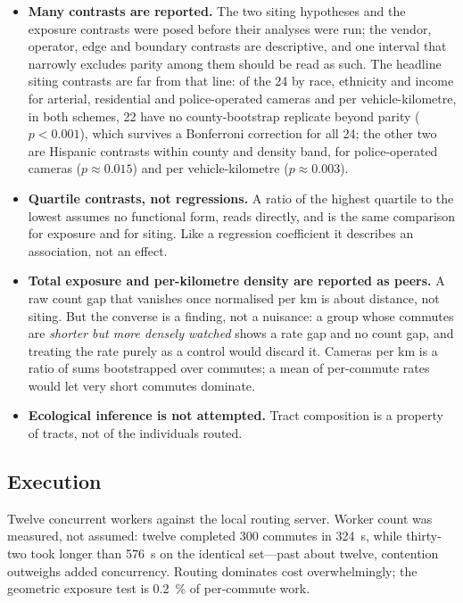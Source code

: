 \documentclass[11pt,twoside]{article}
\begin{document}
\begin{itemize}
{    parity} under both bootstraps. Earlier rounds of this study asked instead that the
    intervals on the two quartile means not overlap, a criterion far stricter than a
    \SI{5}{\percent} test \citep{schenker2001}; on the current map the two give the same
    verdict on every contrast of
    .
  \item \textbf{Many contrasts are reported.} The two siting hypotheses and the exposure
    contrasts were posed before their analyses were run; the vendor, operator, edge and
    boundary contrasts are descriptive, and one interval that narrowly excludes parity among
    them should be read as such. The headline siting contrasts are far from that line: of the
    24 by race, ethnicity and income for arterial, residential and police-operated cameras and
    per vehicle-kilometre, in both schemes, 22 have no county-bootstrap replicate beyond parity
    ($p<0.001$), which survives a Bonferroni correction for all 24; the other two are Hispanic
    contrasts within county and density band, for police-operated cameras ($p\approx0.015$)
    and per vehicle-kilometre ($p\approx0.003$).
  \item \textbf{Quartile contrasts, not regressions.} A ratio of the highest quartile to the
    lowest assumes no functional form, reads directly, and is the same comparison for exposure
    and for siting. Like a regression coefficient it describes an association, not an effect.
  \item \textbf{Total exposure and per-kilometre density are reported as peers.} A raw
    count gap that vanishes once normalised per km is about distance, not siting. But the
    converse is a finding, not a nuisance: a group whose commutes are \emph{shorter but
    more densely watched} shows a rate gap and no count gap, and treating the rate purely
    as a control would discard it. Cameras per km is a ratio of sums bootstrapped over
    commutes; a mean of per-commute rates would let very short commutes dominate.
  \item \textbf{Ecological inference is not attempted.} Tract composition is a property of
    tracts, not of the individuals routed.
\end{itemize}

\subsection{Execution}
\label{sec:method:exec}

Twelve concurrent workers against the local routing server. Worker count was measured, not
assumed: twelve completed 300 commutes in \SI{324}{\second}, while thirty-two took longer
than \SI{576}{\second} on the identical set---past about twelve, contention outweighs added
concurrency. Routing dominates cost overwhelmingly; the geometric exposure test is
\SI{0.2}{\percent} of per-commute work.
\end{document}
